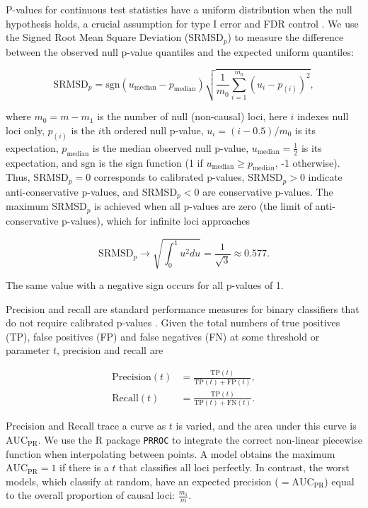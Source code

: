 \documentclass[11pt]{article}
\newcommand{\rmsd}{\text{SRMSD}_p}
\newcommand{\auc}{\text{AUC}_\text{PR}}
\begin{document}
\begin{linenumbers}
P-values for continuous test statistics have a uniform distribution when the null hypothesis holds, a crucial assumption for type I error and FDR control \citep{storey_positive_2003, storey_statistical_2003}.
We use the Signed Root Mean Square Deviation ($\rmsd$) to measure the difference between the observed null p-value quantiles and the expected uniform quantiles:
\begin{linenomath*}
$$
\rmsd
=
\text{sgn}(u_\text{median} - p_\text{median} ) \sqrt{ \frac{1}{m_0} \sum_{i = 1}^{m_0} \left( u_i - p_{(i)} \right)^2 },
$$
\end{linenomath*}
where
$m_0 = m - m_1$ is the number of null (non-causal) loci,
here $i$ indexes null loci only,
$p_{(i)}$ is the $i$th ordered null p-value,
$u_i = ( i - 0.5 ) / m_0$ is its expectation,
$p_\text{median}$ is the median observed null p-value,
$u_\text{median} = \frac{1}{2}$ is its expectation,
and $\text{sgn}$ is the sign function (1 if $u_\text{median} \ge p_\text{median}$, -1 otherwise).
Thus, $\rmsd = 0$ corresponds to calibrated p-values, $\rmsd > 0$ indicate anti-conservative p-values, and $\rmsd < 0$ are conservative p-values.
The maximum $\rmsd$ is achieved when all p-values are zero (the limit of anti-conservative p-values), which for infinite loci approaches
\begin{linenomath*}
$$
\rmsd
\rightarrow
\sqrt{ \int_0^1 u^2 du }
=
\frac{1}{ \sqrt{ 3 } }
\approx
0.577
.
$$
\end{linenomath*}
The same value with a negative sign occurs for all p-values of 1.

Precision and recall are standard performance measures for binary classifiers that do not require calibrated p-values \citep{grau_prroc:_2015}.
Given the total numbers of true positives (TP), false positives (FP) and false negatives (FN) at some threshold or parameter $t$, precision and recall are
\begin{linenomath*}
\begin{align*}
  \text{Precision}(t)
  &=
    \frac{ \text{TP}(t) }{ \text{TP}(t) + \text{FP}(t) }
    , \\
  \text{Recall}(t)
  &=
    \frac{ \text{TP}(t) }{ \text{TP}(t) + \text{FN}(t) }
    .
\end{align*}
\end{linenomath*}
Precision and Recall trace a curve as $t$ is varied, and the area under this curve is $\auc$.
We use the R package \texttt{PRROC} to integrate the correct non-linear piecewise function when interpolating between points.
A model obtains the maximum $\auc = 1$ if there is a $t$ that classifies all loci perfectly.
In contrast, the worst models, which classify at random, have an expected precision ($= \auc$) equal to the overall proportion of causal loci:
$\frac{m_1}{m}$.



\end{linenumbers}
\end{document}

